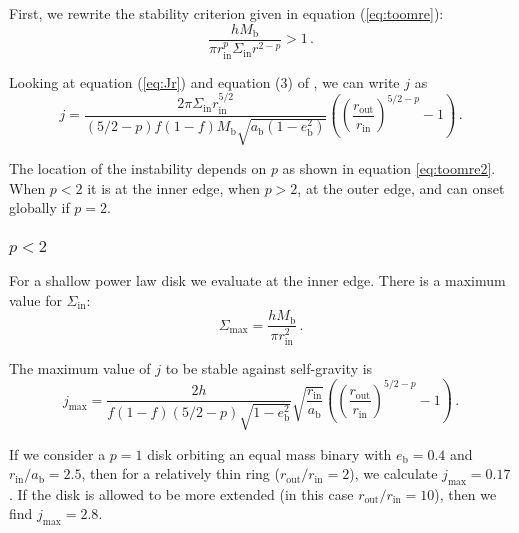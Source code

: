 \documentclass[twocolumn]{aastex631}
\begin{document}
First, we rewrite the stability criterion given in equation (\ref{eq:toomre}):
\begin{equation}
    \label{eq:toomre2}
    \frac{h M_\text{b}}{\pi r_\text{in}^p \Sigma_\text{in} r^{2-p}} > 1\, .
\end{equation}

Looking at equation (\ref{eq:Jr}) and equation (3) of \citet{abod2022}, we can write $j$ as
\begin{equation}
    \label{eq:j-full-disk}
    j = \frac{2\pi \Sigma_\text{in} r_\text{in}^{5/2}}{(5/2-p)f(1-f)M_\text{b}\sqrt{a_\text{b}(1-e_\text{b}^2)}}  \left( \left( \frac{r_\text{out}}{r_\text{in}} \right)^{5/2 - p}- 1\right) \, .
\end{equation}

The location of the instability depends on $p$ as shown in equation \ref{eq:toomre2}. When $p<2$ it is at the inner edge, when $p>2$, at the outer edge, and can onset globally if $p=2$.

\subsubsection{$p<2$}
\label{subsubsec:shallow-p}
For a shallow power law disk we evaluate at the inner edge. There is a maximum value for $\Sigma_\text{in}$:
\begin{equation}
    \Sigma_\text{max} = \frac{hM_\text{b}}{\pi r_\text{in}^2}\, .
\end{equation}

The maximum value of $j$ to be stable against self-gravity is
\begin{equation}
    \label{eq:jmax-shallow}
    j_\text{max} = \frac{2h}{f (1-f) (5/2 - p)\sqrt{1-e_\text{b}^2}} \sqrt{\frac{r_\text{in}}{a_\text{b}}} \left( \left( \frac{r_\text{out}}{r_\text{in}} \right)^{5/2 - p}- 1\right)\, .
\end{equation}

If we consider a $p=1$ disk orbiting an equal mass binary with $e_\text{b}=0.4$ and $r_\text{in}/a_\text{b}=2.5$, then for a relatively thin ring ($r_\text{out}/r_\text{in} = 2$), we calculate $j_\text{max} = 0.17$. If the disk is allowed to be more extended (in this case $r_\text{out}/r_\text{in} = 10$), then we find $j_\text{max} = 2.8$. 
\end{document}

